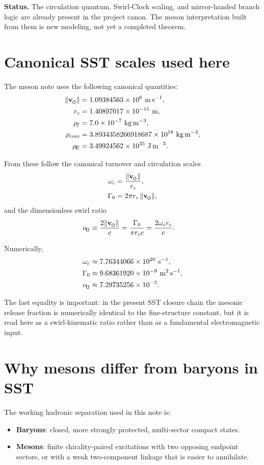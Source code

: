 \documentclass[11pt,a4paper]{article}
\newcommand{\swirlarrow}{\mathchoice{\mkern-2mu\scriptstyle\boldsymbol{\circlearrowleft}}{\mkern-2mu\scriptstyle\boldsymbol{\circlearrowleft}}{\mkern-2mu\scriptscriptstyle\boldsymbol{\circlearrowleft}}{\mkern-2mu\scriptscriptstyle\boldsymbol{\circlearrowleft}}}
\newcommand{\vswirl}{\mathbf{v}_{\swirlarrow}}
\newcommand{\rhof}{\rho_{\!f}}
\newcommand{\rhoE}{\rho_{\!E}}
\newcommand{\rhocore}{\rho_{\text{core}}}
\newcommand{\rc}{r_c}
\newcommand{\Gammazero}{\Gamma_0}
\newcommand{\omegac}{\omega_c}
\newcommand{\alphasw}{\alpha_{\!\swirlarrow}}
\newcommand{\Status}[1]{\par\smallskip\noindent\textbf{Status.} #1\par\smallskip}
\begin{document}
\Status{The circulation quantum, Swirl-Clock scaling, and mirror-handed branch logic are already present in the project canon. The meson interpretation built from them is new modeling, not yet a completed theorem.}

\section{Canonical SST scales used here}
The meson note uses the following canonical quantities:
\begin{align}
\lVert \vswirl \rVert &= 1.09384563\times 10^{6}\ \mathrm{m\,s^{-1}},\\
\rc &= 1.40897017\times 10^{-15}\ \mathrm{m},\\
\rhof &= 7.0\times 10^{-7}\ \mathrm{kg\,m^{-3}},\\
\rhocore &= 3.8934358266918687\times 10^{18}\ \mathrm{kg\,m^{-3}},\\
\rhoE &= 3.49924562\times 10^{35}\ \mathrm{J\,m^{-3}}.
\end{align}

From these follow the canonical turnover and circulation scales
\begin{align}
\omegac &= \frac{\lVert \vswirl \rVert}{\rc},\\
\Gammazero &= 2\pi \rc\,\lVert \vswirl \rVert,
\end{align}
and the dimensionless swirl ratio
\begin{align}
\alphasw &\equiv \frac{2\lVert \vswirl \rVert}{c}
= \frac{\Gammazero}{\pi \rc c}
= \frac{2\omegac \rc}{c}.
\end{align}

Numerically,
\begin{align}
\omegac &\approx 7.76344066\times 10^{20}\ \mathrm{s^{-1}},\\
\Gammazero &\approx 9.68361920\times 10^{-9}\ \mathrm{m^{2}\,s^{-1}},\\
\alphasw &\approx 7.29735256\times 10^{-3}.
\end{align}

The last equality is important: in the present SST closure chain the mesonic release fraction is numerically identical to the fine-structure constant, but it is read here as a swirl-kinematic ratio rather than as a fundamental electromagnetic input.

\section{Why mesons differ from baryons in SST}
The working hadronic separation used in this note is:
\begin{itemize}
    \item \textbf{Baryons}: closed, more strongly protected, multi-sector compact states.
    \item \textbf{Mesons}: finite chirality-paired excitations with two opposing endpoint sectors, or with a weak two-component linkage that is easier to annihilate.
\end{itemize}
\end{document}
